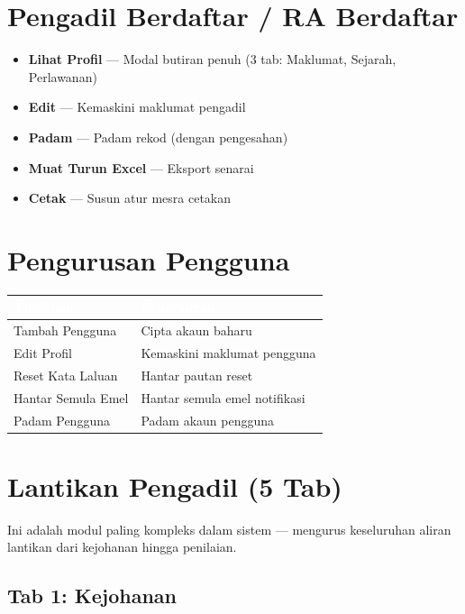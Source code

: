 \documentclass[12pt,a4paper]{report}
\begin{document}
\section{Pengadil Berdaftar / RA Berdaftar}

\begin{itemize}[label=\textcolor{pbnpblue}{\faChevronRight}]
  \item \textbf{Lihat Profil} --- Modal butiran penuh (3 tab: Maklumat, Sejarah, Perlawanan)
  \item \textbf{Edit} --- Kemaskini maklumat pengadil
  \item \textbf{Padam} --- Padam rekod (dengan pengesahan)
  \item \textbf{Muat Turun Excel} --- Eksport senarai
  \item \textbf{Cetak} --- Susun atur mesra cetakan
\end{itemize}

\section{Pengurusan Pengguna}

\begin{table}[H]
\centering
{}
\begin{tabularx}{\textwidth}{l X}
\toprule
\rowcolor{tableheader}
\textcolor{white}{\textbf{Tindakan}} & \textcolor{white}{\textbf{Penerangan}} \\
\midrule
Tambah Pengguna & Cipta akaun baharu \\
Edit Profil & Kemaskini maklumat pengguna \\
Reset Kata Laluan & Hantar pautan reset \\
Hantar Semula Emel & Hantar semula emel notifikasi \\
Padam Pengguna & Padam akaun pengguna \\
\bottomrule
\end{tabularx}
\end{table}

\section{Lantikan Pengadil (5 Tab)}

Ini adalah modul paling kompleks dalam sistem --- mengurus keseluruhan aliran lantikan dari kejohanan hingga penilaian.

\subsection{Tab 1: Kejohanan}
\end{document}
